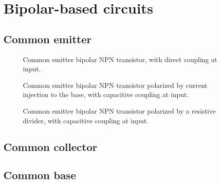 
\chapter{Bipolar-based circuits}
	
	

\section{Common emitter}

	
	\begin{figure}[htb]
		\centering
		
		\caption{Common emitter bipolar NPN transistor, with direct coupling at input.%
			\label{fig__bip_npn_common_emitter_direct_coupling}}
	\end{figure}

	\begin{figure}[htb]
		\centering
		
		\caption{Common emitter bipolar NPN transistor polarized by current injection to the base, with capacitive coupling at input.%
			\label{fig__bip_npn_common_emitter_I_injection_C_coupling}}
	\end{figure}

	\begin{figure}[htb]
		\centering
		
		\caption{Common emitter bipolar NPN transistor polarized by a resistive divider, with capacitive coupling at input.%
			\label{fig__bip_npn_common_emitter_Rdiv_pol_C_coupling}}
	\end{figure}

\clearpage



\section{Common collector}

	



\section{Common base}


